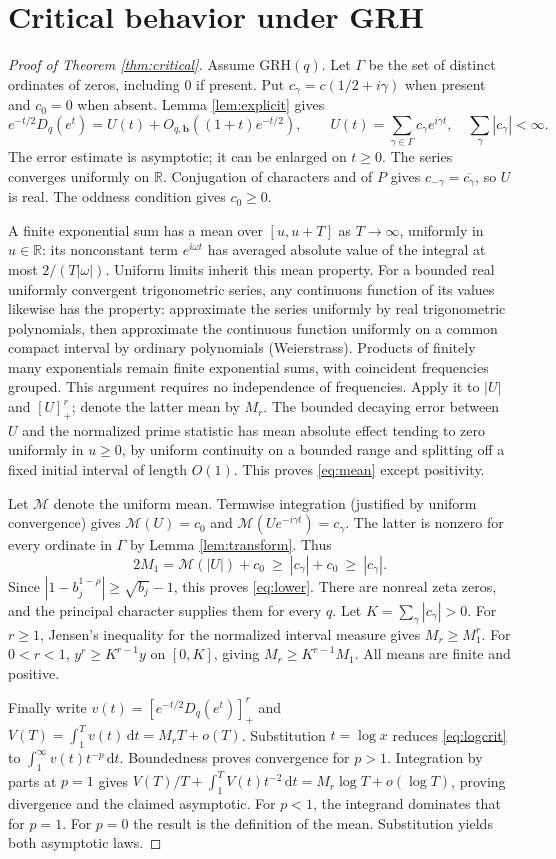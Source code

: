 \documentclass[11pt]{article}
\newcommand{\R}{\mathbb R}
\newcommand{\pp}[1]{[#1]_+}
\newcommand{\dd}{\,\mathrm d}
\newcommand{\GRH}{\mathrm{GRH}}
\begin{document}
\section{Critical behavior under GRH}
\begin{proof}[Proof of Theorem \ref{thm:critical}]
Assume $\GRH(q)$. Let $\Gamma$ be the set of distinct ordinates of zeros, including 0 if present. Put $c_\gamma=c(1/2+i\gamma)$ when present and $c_0=0$ when absent. Lemma \ref{lem:explicit} gives
\[
 e^{-t/2}D_q(e^t)=U(t)+O_{q,\mathbf b}((1+t)e^{-t/2}),\qquad
 U(t)=\sum_{\gamma\in\Gamma}c_\gamma e^{i\gamma t},\quad \sum_{\gamma}|c_\gamma|<\infty.
\]
The error estimate is asymptotic; it can be enlarged on $t\ge0$. The series converges uniformly on $\R$. Conjugation of characters and of $P$ gives $c_{-\gamma}=\overline{c_\gamma}$, so $U$ is real. The oddness condition gives $c_0\ge0$.

A finite exponential sum has a mean over $[u,u+T]$ as $T\to\infty$, uniformly in $u\in\R$: its nonconstant term $e^{i\omega t}$ has averaged absolute value of the integral at most $2/(T|\omega|)$. Uniform limits inherit this mean property. For a bounded real uniformly convergent trigonometric series, any continuous function of its values likewise has the property: approximate the series uniformly by real trigonometric polynomials, then approximate the continuous function uniformly on a common compact interval by ordinary polynomials (Weierstrass). Products of finitely many exponentials remain finite exponential sums, with coincident frequencies grouped. This argument requires no independence of frequencies. Apply it to $|U|$ and $\pp{U}^r$; denote the latter mean by $M_r$. The bounded decaying error between $U$ and the normalized prime statistic has mean absolute effect tending to zero uniformly in $u\ge0$, by uniform continuity on a bounded range and splitting off a fixed initial interval of length $O(1)$. This proves \eqref{eq:mean} except positivity.

Let $\mathcal M$ denote the uniform mean. Termwise integration (justified by uniform convergence) gives $\mathcal M(U)=c_0$ and $\mathcal M(Ue^{-i\gamma t})=c_\gamma$. The latter is nonzero for every ordinate in $\Gamma$ by Lemma \ref{lem:transform}. Thus
\[
 2M_1=\mathcal M(|U|)+c_0\ \ge\ |c_\gamma|+c_0\ \ge\ |c_\gamma|.
\]
Since $|1-b_j^{1-\rho}|\ge\sqrt{b_j}-1$, this proves \eqref{eq:lower}. There are nonreal zeta zeros, and the principal character supplies them for every $q$. Let $K=\sum_{\gamma}|c_\gamma|>0$. For $r\ge1$, Jensen's inequality for the normalized interval measure gives $M_r\ge M_1^r$. For $0<r<1$, $y^r\ge K^{r-1}y$ on $[0,K]$, giving $M_r\ge K^{r-1}M_1$. All means are finite and positive.

Finally write $v(t)=\pp{e^{-t/2}D_q(e^t)}^r$ and $V(T)=\int_1^T v(t)\dd t=M_rT+o(T)$. Substitution $t=\log x$ reduces \eqref{eq:logcrit} to $\int_1^\infty v(t)t^{-p}\dd t$. Boundedness proves convergence for $p>1$. Integration by parts at $p=1$ gives $V(T)/T+\int_1^T V(t)t^{-2}\dd t=M_r\log T+o(\log T)$, proving divergence and the claimed asymptotic. For $p<1$, the integrand dominates that for $p=1$. For $p=0$ the result is the definition of the mean. Substitution yields both asymptotic laws.
\end{proof}
\end{document}
